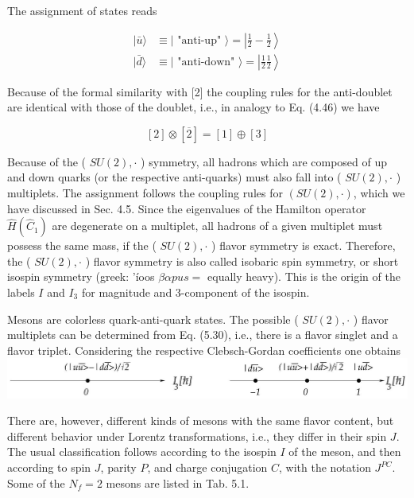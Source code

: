 \documentclass[10pt, letterpaper]{article}
\begin{document}
The assignment of states reads

$$
\begin{aligned}
|\bar{u}\rangle & \equiv \mid \text { "anti-up" }\rangle=\left|\frac{1}{2}-\frac{1}{2}\right\rangle \\
|\bar{d}\rangle & \equiv \mid \text { "anti-down" }\rangle=\left|\frac{1}{2} \frac{1}{2}\right\rangle
\end{aligned}
$$

Because of the formal similarity with [2] the coupling rules for the anti-doublet are identical with those of the doublet, i.e., in analogy to Eq. (4.46) we have

$$
[2] \otimes[\overline{2}]=[1] \oplus[3]
$$

Because of the ( $S U(2), \cdot$ ) symmetry, all hadrons which are composed of up and down quarks (or the respective anti-quarks) must also fall into ( $S U(2), \cdot$ ) multiplets. The assignment follows the coupling rules for $(S U(2), \cdot)$, which we have discussed in Sec. 4.5. Since the eigenvalues of the Hamilton operator $\hat{H}\left(\hat{C}_{1}\right)$ are degenerate on a multiplet, all hadrons of a given multiplet must possess the same mass, if the ( $S U(2), \cdot$ ) flavor symmetry is exact. Therefore, the ( $S U(2), \cdot$ ) flavor symmetry is also called isobaric spin symmetry, or short isospin symmetry (greek: 'íoos $\beta \alpha p u s=$ equally heavy). This is the origin of the labels $I$ and $I_{3}$ for magnitude and 3-component of the isospin.

Mesons are colorless quark-anti-quark states. The possible ( $S U(2), \cdot$ ) flavor multiplets can be determined from Eq. (5.30), i.e., there is a flavor singlet and a flavor triplet. Considering the respective Clebsch-Gordan coefficients one obtains\\
\includegraphics[scale=0.3, center]{2025_05_20_8618f55a41bfe980b4b2g-65(1)}

There are, however, different kinds of mesons with the same flavor content, but different behavior under Lorentz transformations, i.e., they differ in their spin $J$. The usual classification follows according to the isospin $I$ of the meson, and then according to spin $J$, parity $P$, and charge conjugation $C$, with the notation $J^{P C}$. Some of the $N_{f}=2$ mesons are listed in Tab. 5.1.
\end{document}
